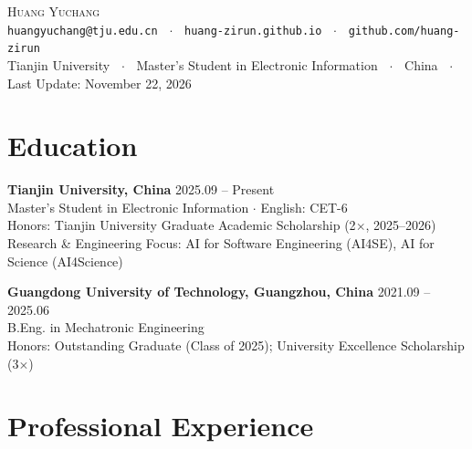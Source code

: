 \documentclass[10pt,letterpaper]{article}
\begin{document}
\begin{center}
  {\Huge\scshape Huang Yuchang} \\[5pt]
  \texttt{huangyuchang@tju.edu.cn}
  \textbf{~$\cdot$~}
  \texttt{huang-zirun.github.io}
  \textbf{~$\cdot$~}
  \texttt{github.com/huang-zirun} \\[2pt]
  Tianjin University \textbf{~$\cdot$~} Master's Student in Electronic Information \textbf{~$\cdot$~} China \textbf{~$\cdot$~} Last Update: November 22, 2026
\end{center}

\vspace{-4pt}

\section{Education}

\textbf{Tianjin University, China} \hfill 2025.09 -- Present \\
Master's Student in Electronic Information $\cdot$ English: CET-6 \\
Honors: Tianjin University Graduate Academic Scholarship (2$\times$, 2025--2026) \\
Research \& Engineering Focus: AI for Software Engineering (AI4SE), AI for Science (AI4Science)

\vspace{3pt}

\textbf{Guangdong University of Technology, Guangzhou, China} \hfill 2021.09 -- 2025.06 \\
B.Eng. in Mechatronic Engineering \\
Honors: Outstanding Graduate (Class of 2025); University Excellence Scholarship (3$\times$)

\section{Professional Experience}
\end{document}

